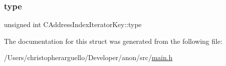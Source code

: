 \mbox{\label{struct_c_address_index_iterator_key_af1a84c54d507561b6bc658ed82118714}} 
\subsubsection{\texorpdfstring{type}{type}}
{\footnotesize\ttfamily unsigned int C\+Address\+Index\+Iterator\+Key\+::type}



The documentation for this struct was generated from the following file\+:\begin{DoxyCompactItemize}
\item 
/\+Users/christopherarguello/\+Developer/anon/src/\mbox{\hyperlink{main_8h}{main.\+h}}\end{DoxyCompactItemize}
